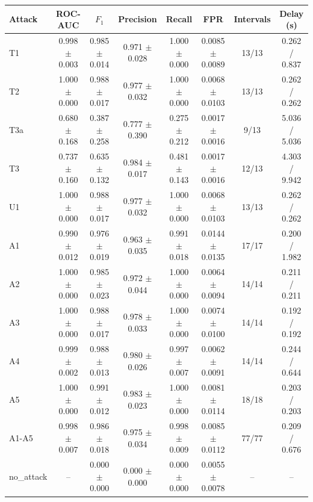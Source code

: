\begin{tabular}{lccccccc}
\hline
Attack & ROC-AUC & $F_1$ & Precision & Recall & FPR & Intervals & Delay (s) \\
\hline
T1 & 0.998 $\pm$ 0.003 & 0.985 $\pm$ 0.014 & 0.971 $\pm$ 0.028 & 1.000 $\pm$ 0.000 & 0.0085 $\pm$ 0.0089 & 13/13 & 0.262 / 0.837 \\
T2 & 1.000 $\pm$ 0.000 & 0.988 $\pm$ 0.017 & 0.977 $\pm$ 0.032 & 1.000 $\pm$ 0.000 & 0.0068 $\pm$ 0.0103 & 13/13 & 0.262 / 0.262 \\
T3a & 0.680 $\pm$ 0.168 & 0.387 $\pm$ 0.258 & 0.777 $\pm$ 0.390 & 0.275 $\pm$ 0.212 & 0.0017 $\pm$ 0.0016 & 9/13 & 5.036 / 5.036 \\
T3 & 0.737 $\pm$ 0.160 & 0.635 $\pm$ 0.132 & 0.984 $\pm$ 0.017 & 0.481 $\pm$ 0.143 & 0.0017 $\pm$ 0.0016 & 12/13 & 4.303 / 9.942 \\
U1 & 1.000 $\pm$ 0.000 & 0.988 $\pm$ 0.017 & 0.977 $\pm$ 0.032 & 1.000 $\pm$ 0.000 & 0.0068 $\pm$ 0.0103 & 13/13 & 0.262 / 0.262 \\
A1 & 0.990 $\pm$ 0.012 & 0.976 $\pm$ 0.019 & 0.963 $\pm$ 0.035 & 0.991 $\pm$ 0.018 & 0.0144 $\pm$ 0.0135 & 17/17 & 0.200 / 1.982 \\
A2 & 1.000 $\pm$ 0.000 & 0.985 $\pm$ 0.023 & 0.972 $\pm$ 0.044 & 1.000 $\pm$ 0.000 & 0.0064 $\pm$ 0.0094 & 14/14 & 0.211 / 0.211 \\
A3 & 1.000 $\pm$ 0.000 & 0.988 $\pm$ 0.017 & 0.978 $\pm$ 0.033 & 1.000 $\pm$ 0.000 & 0.0074 $\pm$ 0.0100 & 14/14 & 0.192 / 0.192 \\
A4 & 0.999 $\pm$ 0.002 & 0.988 $\pm$ 0.013 & 0.980 $\pm$ 0.026 & 0.997 $\pm$ 0.007 & 0.0062 $\pm$ 0.0091 & 14/14 & 0.244 / 0.644 \\
A5 & 1.000 $\pm$ 0.000 & 0.991 $\pm$ 0.012 & 0.983 $\pm$ 0.023 & 1.000 $\pm$ 0.000 & 0.0081 $\pm$ 0.0114 & 18/18 & 0.203 / 0.203 \\
A1-A5 & 0.998 $\pm$ 0.007 & 0.986 $\pm$ 0.018 & 0.975 $\pm$ 0.034 & 0.998 $\pm$ 0.009 & 0.0085 $\pm$ 0.0112 & 77/77 & 0.209 / 0.676 \\
no\_attack & -- & 0.000 $\pm$ 0.000 & 0.000 $\pm$ 0.000 & 0.000 $\pm$ 0.000 & 0.0055 $\pm$ 0.0078 & -- & -- \\
\hline
\end{tabular}
